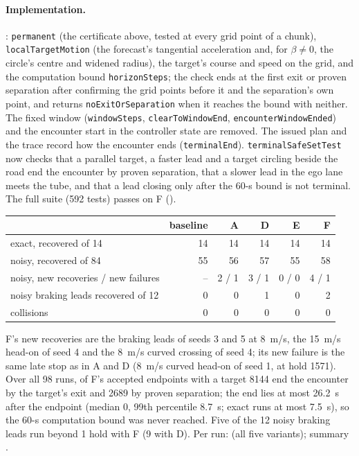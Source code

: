 \documentclass[11pt]{article}
\begin{document}
\paragraph{Implementation.} :
\texttt{permanent} (the certificate above, tested at every grid point of a
chunk), \texttt{localTargetMotion} (the forecast's tangential acceleration and,
for $\beta\ne0$, the circle's centre and widened radius), the target's course
and speed on the grid, and the computation bound \texttt{horizonSteps}; the
check ends at the first exit or proven separation after confirming the grid
points before it and the separation's own point, and returns
\texttt{noExitOrSeparation} when it reaches the bound with neither. The fixed
window (\texttt{windowSteps}, \texttt{clearToWindowEnd},
\texttt{encounterWindowEnded}) and the encounter start in the controller state
are removed. The issued plan and the trace record how the encounter ends
(\texttt{terminalEnd}). \texttt{terminalSafeSetTest} now checks that a
parallel target, a faster lead and a target circling beside the road end the
encounter by proven separation, that a slower lead in the ego lane meets the
tube, and that a lead closing only after the 60-s bound is not terminal. The
full suite (592 tests) passes on F ().

\begin{center}
\begin{tabular}{lrrrrr}
\toprule
 & baseline & A & D & E & F\\
\midrule
exact, recovered of 14 & 14 & 14 & 14 & 14 & 14\\
noisy, recovered of 84 & 55 & 56 & 57 & 55 & 58\\
noisy, new recoveries / new failures & -- & 2 / 1 & 3 / 1 & 0 / 0 & 4 / 1\\
noisy braking leads recovered of 12 & 0 & 0 & 1 & 0 & 2\\
collisions & 0 & 0 & 0 & 0 & 0\\
\bottomrule
\end{tabular}
\end{center}
F's new recoveries are the braking leads of seeds 3 and 5 at 8~m/s, the
15~m/s head-on of seed 4 and the 8~m/s curved crossing of seed 4; its new
failure is the same late stop as in A and D (8~m/s curved head-on of seed 1,
at hold 1571). Over all 98 runs, of F's accepted endpoints with a target
8144 end the encounter by the target's exit and 2689 by proven separation; the
end lies at most 26.2~s after the endpoint (median 0, 99th percentile 8.7~s;
exact runs at most 7.5~s), so the 60-s computation bound was never reached. Five of the 12 noisy braking leads run beyond 1 hold with
F (9 with D). Per run:  (all five variants); summary
.
\end{document}
